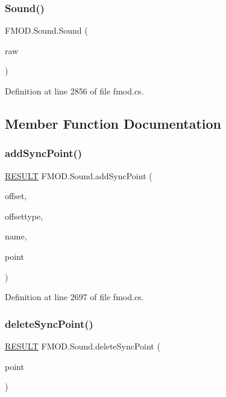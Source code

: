 \subsubsection{\texorpdfstring{Sound()}{Sound()}}
{\footnotesize\ttfamily F\+M\+O\+D.\+Sound.\+Sound (\begin{DoxyParamCaption}\item[{Int\+Ptr}]{raw }\end{DoxyParamCaption})}



Definition at line 2856 of file fmod.\+cs.



\subsection{Member Function Documentation}
\mbox{\label{class_f_m_o_d_1_1_sound_a9ace9587bd4654227f74c9d80cc16473}} 
\subsubsection{\texorpdfstring{add\+Sync\+Point()}{addSyncPoint()}}
{\footnotesize\ttfamily \hyperlink{namespace_f_m_o_d_a305d1176ef3f8c8815861a60407ac33d}{R\+E\+S\+U\+LT} F\+M\+O\+D.\+Sound.\+add\+Sync\+Point (\begin{DoxyParamCaption}\item[{uint}]{offset,  }\item[{\hyperlink{namespace_f_m_o_d_aff20975332f93ff2180d2681cb43929f}{T\+I\+M\+E\+U\+N\+IT}}]{offsettype,  }\item[{string}]{name,  }\item[{out Int\+Ptr}]{point }\end{DoxyParamCaption})}



Definition at line 2697 of file fmod.\+cs.

\mbox{\label{class_f_m_o_d_1_1_sound_a9fe7245070dc8b3c4b4ff9961d92a0b9}} 
\subsubsection{\texorpdfstring{delete\+Sync\+Point()}{deleteSyncPoint()}}
{\footnotesize\ttfamily \hyperlink{namespace_f_m_o_d_a305d1176ef3f8c8815861a60407ac33d}{R\+E\+S\+U\+LT} F\+M\+O\+D.\+Sound.\+delete\+Sync\+Point (\begin{DoxyParamCaption}\item[{Int\+Ptr}]{point }\end{DoxyParamCaption})}




